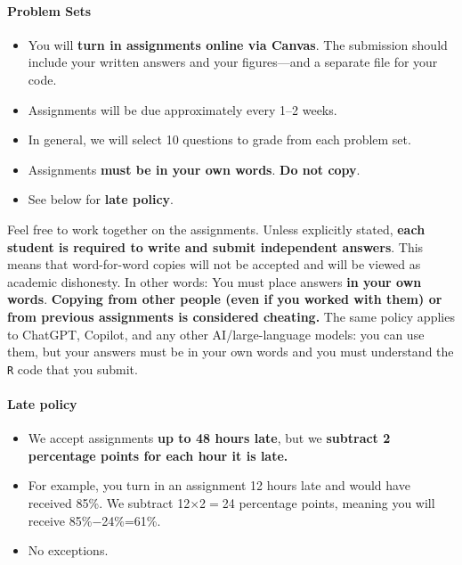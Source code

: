 \documentclass[10pt]{article}
\begin{document}
\paragraph{Problem Sets}
\begin{itemize}
  \item You will \textbf{turn in assignments online via Canvas}. The submission should include your written answers and your figures---and a separate file for your code.
  \item Assignments will be due approximately every 1--2 weeks.
  \item In general, we will select 10 questions to grade from each problem set.
  \item Assignments \textbf{must be in your own words}. \textbf{Do not copy}.
  \item See below for \textbf{late policy}.
\end{itemize}
Feel free to work together on the assignments. Unless explicitly stated, \textbf{each student is required to write and submit independent answers}. This means that word-for-word copies will not be accepted and will be viewed as academic dishonesty. In other words: You must place answers \textbf{in your own words}. \textbf{Copying from other people (even if you worked with them) or from previous assignments is considered cheating.} The same policy applies to ChatGPT, Copilot, and any other AI/large-language models: you can use them, but your answers must be in your own words and you must understand the \texttt{R} code that you submit.

\paragraph{Late policy}
\begin{itemize}
  \item We accept assignments \textbf{up to 48 hours late}, but we \textbf{subtract 2 percentage points for each hour it is late.}
  \item For example, you turn in an assignment 12 hours late and would have received 85\%. We subtract 12$\times$2$=$24 percentage points, meaning you will receive 85\%$-$24\%=61\%.
  \item No exceptions.
\end{itemize}
\end{document}
